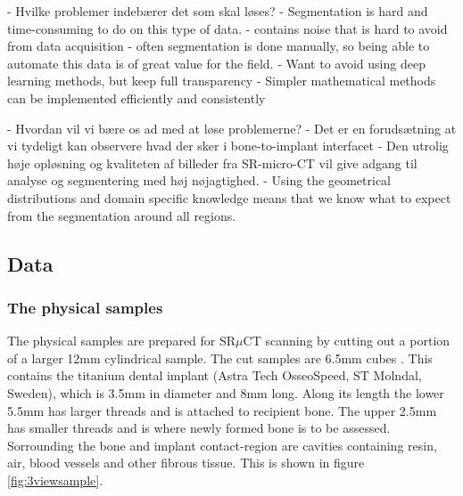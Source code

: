 - Hvilke problemer indebærer det som skal løses?
    - Segmentation is hard and time-consuming to do on this type of data.
      - contains noise that is hard to avoid from data acquisition
      - often segmentation is done manually, so being able to automate this data is of great value for the field.
      - Want to avoid using deep learning methods, but keep full transparency 
      - Simpler mathematical methods can be implemented efficiently and consistently

 - Hvordan vil vi bære os ad med at løse problemerne?
    - Det er en forudsætning at vi tydeligt kan observere hvad der sker i bone-to-implant interfacet
    - Den utrolig høje opløsning og kvaliteten af billeder fra SR-micro-CT vil give adgang til
      analyse og segmentering med høj nøjagtighed.
    - Using the geometrical distributions and domain specific knowledge means that we know
      what to expect from the segmentation around all regions.

\subsection*{Data}

\subsubsection*{The physical samples}

The physical samples are prepared for SR$\mu$CT scanning by cutting out a portion of a larger
12mm cylindrical sample.  The cut samples are 6.5mm cubes . This contains the titanium dental implant (Astra Tech OsseoSpeed, ST Molndal, Sweden), which is 3.5mm in diameter and 8mm long. Along its length the lower 5.5mm has larger threads and is attached to recipient bone. The upper 2.5mm has smaller threads and is where newly formed bone is to be assessed. Sorrounding the bone and implant contact-region are cavities containing resin, air, blood vessels and other fibrous tissue. This is shown in figure \ref{fig:3viewsample}.


